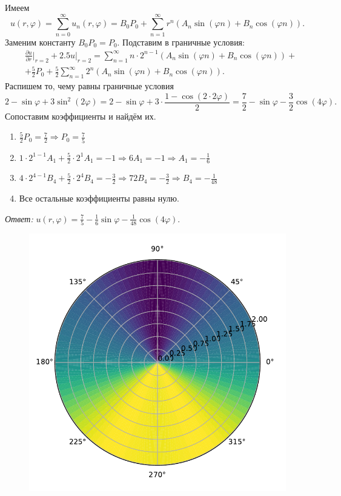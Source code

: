     Имеем
    \[
        u(r, \varphi) = \sum_{n=0}^{\infty} u_n(r, \varphi) = B_0 P_0 + \sum_{n=1}^{\infty} r^n \left( A_n \sin (\varphi n) + B_n \cos (\varphi n) \right).
    \]
    Заменим константу \( B_0 P_0 = P_0 \).
    Подставим в граничные условия:
    \[
        \begin{split}
            & \frac{\partial u}{\partial r} \big|_{r=2} + 2.5 u|_{r=2} = \sum_{n=1}^{\infty} n \cdot 2^{n-1} \left( A_n \sin (\varphi n) + B_n \cos (\varphi n) \right) + \\
            & + \frac{5}{2} P_0 + \frac{5}{2} \sum_{n=1}^{\infty} 2^{n} \left( A_n \sin (\varphi n) + B_n \cos (\varphi n) \right).
        \end{split}
    \]
    Распишем то, чему равны граничные условия
    \[
        2 - \sin \varphi + 3 \sin^2 (2\varphi) = 2 - \sin \varphi + 3 \cdot \frac{1 - \cos(2 \cdot 2 \varphi)}{2} = \frac{7}{2} - \sin \varphi - \frac{3}{2} \cos (4\varphi).
    \]
    Сопоставим коэффициенты и найдём их.
    \begin{enumerate}
        \item \(
            \frac{5}{2} P_0 = \frac{7}{2} \Rightarrow P_0 = \frac{7}{5}
        \)
        \item \(
            1 \cdot 2^{1-1} A_1 + \frac{5}{2} \cdot 2^1 A_1 = -1
            \Rightarrow
            6 A_1 = -1
            \Rightarrow
            A_1 = -\frac{1}{6}
        \)
        \item \( 
            4 \cdot 2^{4-1} B_4 + \frac{5}{2} \cdot 2^4 B_4 = -\frac{3}{2}
            \Rightarrow
            72 B_4 = -\frac{3}{2}
            \Rightarrow 
            B_4 = -\frac{1}{48}
        \)
        \item Все остальные коэффициенты равны нулю.
    \end{enumerate}

    \textit{Ответ:} \( u(r, \varphi) = \frac{7}{5} - \frac{1}{6} \sin\varphi - \frac{1}{48} \cos(4 \varphi) \).

    \begin{figure}[H]
        \centering
        \includegraphics[width=14cm]{p1.pdf}
    \end{figure}


